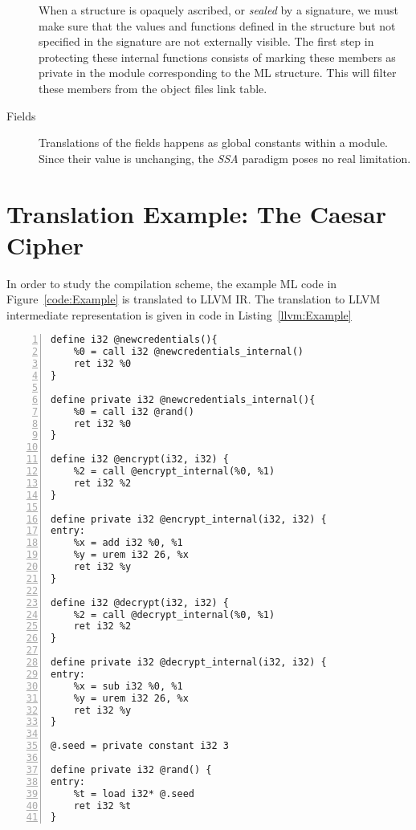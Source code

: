 \documentclass[10pt,a4paper]{report}
\begin{document}
\begin{description}
When a structure is opaquely ascribed, or \emph{sealed} by a signature, we must make sure that the values and functions defined in the structure but not specified in the signature are not externally visible. The first step in protecting these internal functions consists of marking these members as private in the module corresponding to the ML structure. This will filter these members from the object files link table. %


\item[Fields]
Translations of the fields happens as global constants within a module. Since their value is unchanging, the \emph{SSA} paradigm poses no real limitation.

\end{description}

\section{Translation Example: The Caesar Cipher}
In order to study the compilation scheme, the example ML code in Figure~\ref{code:Example} is translated to LLVM IR. The translation to LLVM intermediate representation is given in code in Listing~\ref{llvm:Example}

\begin{lstlisting}[frame=single,numbers=left, language={[x86masm]Assembler}, caption=LLVM IR for the example,
label=llvm:Example]
define i32 @newcredentials(){
	%0 = call i32 @newcredentials_internal()
	ret i32 %0
}

define private i32 @newcredentials_internal(){
	%0 = call i32 @rand()
	ret i32 %0
}

define i32 @encrypt(i32, i32) {
	%2 = call @encrypt_internal(%0, %1)
	ret i32 %2
}

define private i32 @encrypt_internal(i32, i32) { 
entry:
	%x = add i32 %0, %1
	%y = urem i32 26, %x 
	ret i32 %y
}

define i32 @decrypt(i32, i32) { 
	%2 = call @decrypt_internal(%0, %1)
	ret i32 %2
}

define private i32 @decrypt_internal(i32, i32) { 
entry:
	%x = sub i32 %0, %1
	%y = urem i32 26, %x 
	ret i32 %y
}

@.seed = private constant i32 3	

define private i32 @rand() {
entry:
	%t = load i32* @.seed
	ret i32 %t
}
\end{lstlisting}
\end{document}
